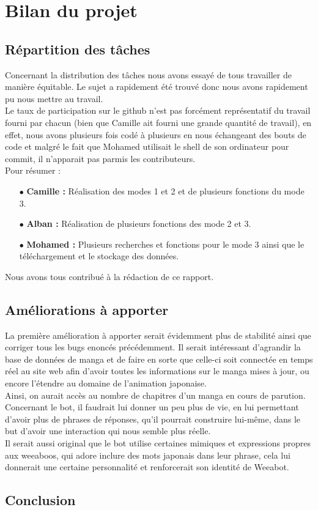 \documentclass[paper=a4, fontsize=11pt]{article}
\begin{document}
\section{Bilan du projet}

\subsection{Répartition des tâches}
Concernant la distribution des tâches nous avons essayé de tous travailler de manière équitable. Le sujet a rapidement été trouvé donc nous avons rapidement pu nous mettre au travail.\\
Le taux de participation sur le github n'est pas forcément représentatif du travail fourni par chacun (bien que Camille ait fourni une grande quantité de travail), en effet, nous avons plusieurs fois codé à plusieurs en nous échangeant des bouts de code et malgré le fait que Mohamed utilisait le shell de son ordinateur pour commit, il n'apparait pas parmis les contributeurs.\\

Pour résumer : \\

\begin{itemize}
\item[$\bullet$] \textbf{Camille :} Réalisation des modes 1 et 2 et de plusieurs fonctions du mode 3.\\
\item[$\bullet$] \textbf{Alban :} Réalisation de plusieurs fonctions des mode 2 et 3.\\
\item[$\bullet$] \textbf{Mohamed :} Plusieurs recherches et fonctions pour le mode 3 ainsi que le téléchargement et le stockage des données.\\
\end{itemize}
Nous avons tous contribué à la rédaction de ce rapport.\\

\subsection{Améliorations à apporter}

La première amélioration à apporter serait évidemment plus de stabilité ainsi que corriger tous les bugs enoncés précédemment. Il serait intéressant d'agrandir la base de données de manga et de faire en sorte que celle-ci soit connectée en temps réel au site web afin d'avoir toutes les informations sur le manga mises à jour, ou encore l'étendre au domaine de l'animation japonaise.\\
Ainsi, on aurait accès au nombre de chapitres d'un manga en cours de parution.
Concernant le bot, il faudrait lui donner un peu plus de vie, en lui permettant d'avoir plus de phrases de réponses, qu'il pourrait construire lui-même, dans le but d'avoir une interaction qui nous semble plus réelle.\\
Il serait aussi original que le bot utilise certaines mimiques et expressions propres aux weeaboos, qui adore inclure des mots japonais dans leur phrase, cela lui donnerait une certaine personnalité et renforcerait son identité de Weeabot.\\

\subsection{Conclusion}
\end{document}
